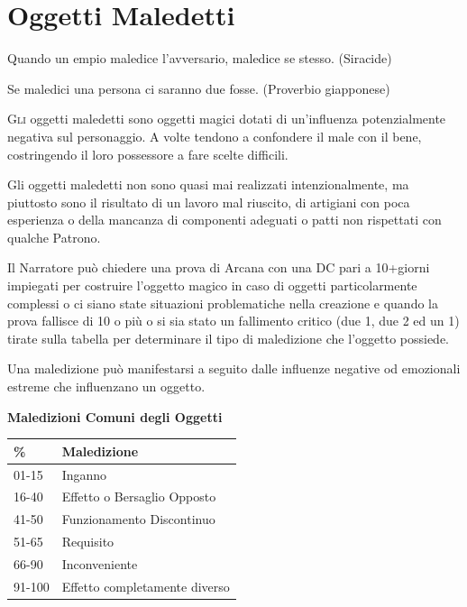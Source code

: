 \pagebreak

\section{Oggetti Maledetti}

\begin{changemargin}{0cm}{0.5cm}\begin{enfasi}{Quando un empio maledice l'avversario, maledice se stesso. (Siracide)

\medskip

Se maledici una persona ci saranno due fosse. (Proverbio giapponese)}
\end{enfasi}\end{changemargin}\medskip

\begin{multicols}{2}

\label{oggetti-maledetti}

\lettrine[lines=2, lhang=0.33, loversize=0.25, findent=1.5em]{G}{li} oggetti maledetti sono oggetti magici dotati di un'influenza potenzialmente negativa sul personaggio. A volte tendono a confondere il male con il bene, costringendo il loro possessore a fare scelte difficili.

Gli oggetti maledetti non sono quasi mai realizzati intenzionalmente, ma piuttosto sono il risultato di un lavoro mal riuscito, di artigiani con poca esperienza o della mancanza di componenti adeguati o patti non rispettati con qualche Patrono.

Il Narratore può chiedere una prova di Arcana con una DC pari a 10+giorni impiegati per costruire l'oggetto magico in caso di oggetti particolarmente complessi o ci siano state situazioni problematiche nella creazione e quando la prova fallisce di 10 o più o si sia stato un fallimento critico (due 1, due 2 ed un 1) tirate sulla tabella per determinare il tipo di maledizione che l'oggetto possiede.

Una maledizione può manifestarsi a seguito dalle influenze negative od emozionali estreme che influenzano un oggetto.

\medskip

\textbf{Maledizioni Comuni degli Oggetti}

\medskip

\begin{tabular}{ll}
\textbf{\%} & \textbf{Maledizione}\\
\toprule
01-15     & Inganno\\
16-40       & Effetto o Bersaglio Opposto\\
41-50       & Funzionamento Discontinuo\\
51-65       & Requisito\\
66-90       & Inconveniente\\
91-100      & Effetto completamente diverso\\
\end{tabular}


\end{multicols}
